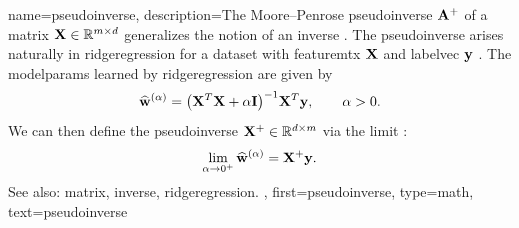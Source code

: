 {name={pseudoinverse},
	description={The Moore–Penrose pseudoinverse ${\bf A}^{+}$ 
 		of a \gls{matrix} ${\bf X} \in \mathbb{R}^{m \times d}$ 
		generalizes the notion of an \gls{inverse} \cite{GolubVanLoanBook}. 
		The pseudoinverse arises naturally in \gls{ridgeregression} for a 
		\gls{dataset} with \gls{featuremtx} ${\bf X}$ and \gls{labelvec} 
		${\bf y}$ \cite[Ch.\ 3]{hastie01statisticallearning}. 
		The \glspl{modelparam} learned by \gls{ridgeregression} 
  		are given by
  		\[
  		\widehat{{\bf w}}^{(\alpha)}  = \big({\bf X}^{T} {\bf X} + \alpha \mathbf{I} \big)^{-1} {\bf X}^{T} {\bf y}, \qquad \alpha > 0.
  		\]
  		We can then define the pseudoinverse ${\bf X}^{+} \in \mathbb{R}^{d \times m}$ via 
  		the limit \cite[Ch. 3]{benisrael2003generalized}:
  		\[
  		\lim_{\alpha \to 0^+} \widehat{{\bf w}}^{(\alpha)} = {\bf X}^+ {\bf y}.
  		\]
		See also: \gls{matrix}, \gls{inverse}, \gls{ridgeregression}. },
 	first={pseudoinverse},
 	type=math, 
 	text={pseudoinverse}
}

